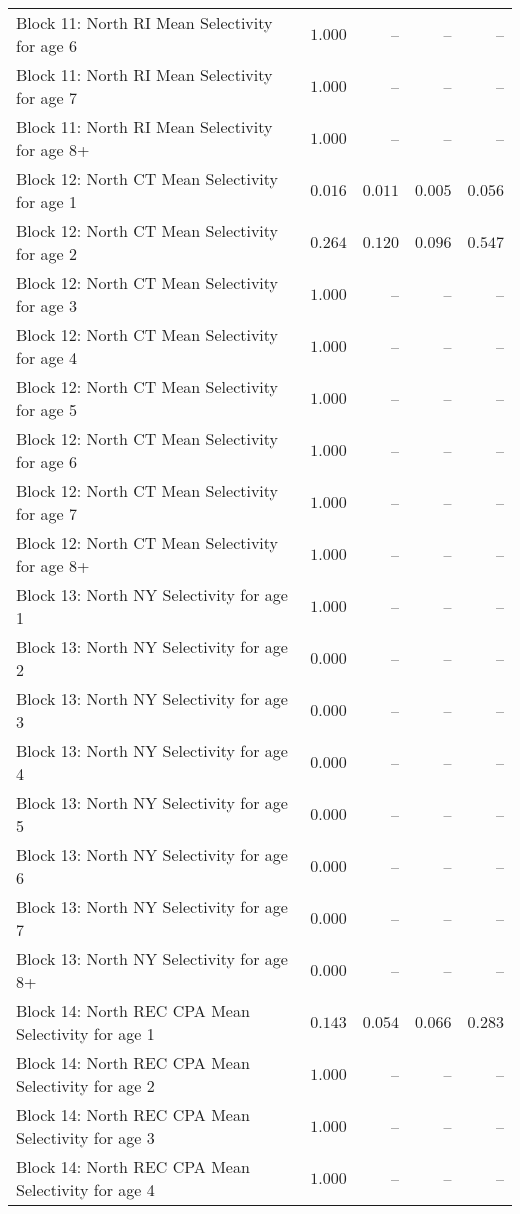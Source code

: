 \documentclass[
]{article}
\begin{document}
\begin{landscape}
\begin{longtable}[t]{lrrrr}
Block 11: North RI Mean Selectivity for age 6 & $1.000$ & -- & -- & --\\
Block 11: North RI Mean Selectivity for age 7 & $1.000$ & -- & -- & --\\
Block 11: North RI Mean Selectivity for age 8+ & $1.000$ & -- & -- & --\\
\addlinespace
Block 12: North CT Mean Selectivity for age 1 & $0.016$ & $0.011$ & $0.005$ & $0.056$\\
Block 12: North CT Mean Selectivity for age 2 & $0.264$ & $0.120$ & $0.096$ & $0.547$\\
Block 12: North CT Mean Selectivity for age 3 & $1.000$ & -- & -- & --\\
Block 12: North CT Mean Selectivity for age 4 & $1.000$ & -- & -- & --\\
Block 12: North CT Mean Selectivity for age 5 & $1.000$ & -- & -- & --\\
\addlinespace
Block 12: North CT Mean Selectivity for age 6 & $1.000$ & -- & -- & --\\
Block 12: North CT Mean Selectivity for age 7 & $1.000$ & -- & -- & --\\
Block 12: North CT Mean Selectivity for age 8+ & $1.000$ & -- & -- & --\\
Block 13: North NY Selectivity for age 1 & $1.000$ & -- & -- & --\\
Block 13: North NY Selectivity for age 2 & $0.000$ & -- & -- & --\\
\addlinespace
Block 13: North NY Selectivity for age 3 & $0.000$ & -- & -- & --\\
Block 13: North NY Selectivity for age 4 & $0.000$ & -- & -- & --\\
Block 13: North NY Selectivity for age 5 & $0.000$ & -- & -- & --\\
Block 13: North NY Selectivity for age 6 & $0.000$ & -- & -- & --\\
Block 13: North NY Selectivity for age 7 & $0.000$ & -- & -- & --\\
\addlinespace
Block 13: North NY Selectivity for age 8+ & $0.000$ & -- & -- & --\\
Block 14: North REC CPA Mean Selectivity for age 1 & $0.143$ & $0.054$ & $0.066$ & $0.283$\\
Block 14: North REC CPA Mean Selectivity for age 2 & $1.000$ & -- & -- & --\\
Block 14: North REC CPA Mean Selectivity for age 3 & $1.000$ & -- & -- & --\\
Block 14: North REC CPA Mean Selectivity for age 4 & $1.000$ & -- & -- & --\\

\end{longtable}
\end{landscape}
\end{document}
